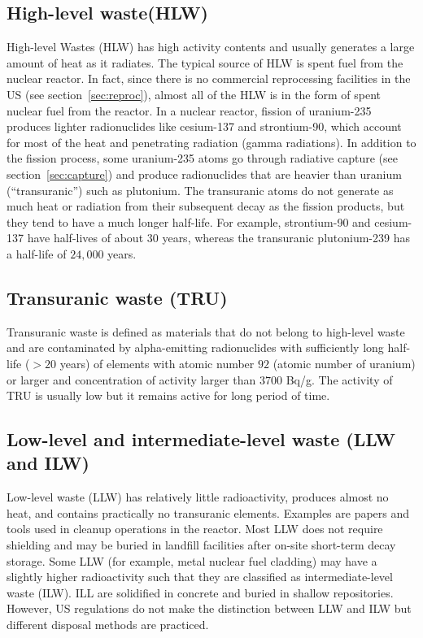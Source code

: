\documentclass[nofootinbib,preprint,aip,pra]{revtex4-1}
\begin{document}
    \subsection{High-level waste(HLW)}
    High-level Wastes (HLW) has high activity contents and usually generates a large amount of
    heat as it radiates. The typical source of HLW is spent fuel from the nuclear reactor.
    In fact, since there is no commercial reprocessing facilities in the US (see section~\ref{sec:reproc}),
    almost all of the HLW is in the form of spent nuclear fuel from the reactor. In a nuclear reactor,
    fission of uranium-235 produces lighter radionuclides like cesium-137 and strontium-90, which
    account for most of the heat and penetrating radiation (gamma radiations). In addition to
    the fission process, some uranium-235 atoms go through radiative capture
    (see section~\ref{sec:capture}) and produce radionuclides that are
    heavier than uranium (``transuranic'') such as plutonium. The transuranic atoms do not generate
    as much heat or radiation from their subsequent decay as the fission products, but they tend to have
    a much longer half-life.
    For example, strontium-90 and cesium-137 have half-lives of about $30$ years, whereas
    the transuranic plutonium-239 has a half-life of $24,000$ years.

    \subsection{Transuranic waste (TRU)}
    \label{sec:tru}
    Transuranic waste is defined as materials that do not belong to high-level waste and are
    contaminated by alpha-emitting radionuclides with
    sufficiently long half-life ($>20$ years) of elements with atomic number $92$ (atomic number of uranium)
    or larger and concentration of activity larger than $3700$ Bq/g.\cite{j83,s01} The activity
    of TRU is usually low but it remains active for long period of time.

    \subsection{Low-level and intermediate-level waste (LLW and ILW)}
    Low-level waste (LLW) has relatively little radioactivity, produces almost no heat,
    and contains practically no
    transuranic elements. Examples are papers and tools used in cleanup operations in the reactor.
    Most LLW does not require shielding and may be buried in landfill 
    facilities after on-site short-term decay storage.
    Some LLW (for example, metal nuclear fuel cladding) may have a slightly
    higher radioactivity such that they are classified
    as intermediate-level waste (ILW). ILL are solidified in concrete and buried in shallow
    repositories.\cite{s01} However, US regulations do not make the distinction
    between LLW and ILW but different disposal methods are practiced.\cite{nrc09, s01}
\end{document}
